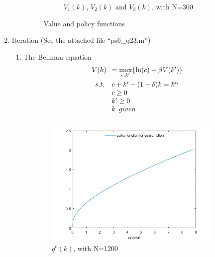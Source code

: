 \documentclass{article}
\begin{document}
\begin{enumerate}
\begin{enumerate}
\begin{figure}[h!]
\begin{subfigure}[b]{.55\linewidth}
                    \caption{$V_1(k)$, $V_2(k)$ and $V_3(k)$, with N=300}
                \end{subfigure}
                \caption{Value and policy functions}
            \end{figure}
        \end{enumerate}
        \item Iteration (See the attached file ``ps6\_q23.m'')
        \begin{enumerate}
            \item The Bellman equation
            \begin{align*}
                &V(k)\enspace=\max_{c,k'}\{\ln(c)+\beta V(k')\}\\
                &\begin{array}{r@{\quad}l}
                    s.t.&c+k'-(1-\delta)k=k^\alpha\\
                    &c\ge0\\
                    &k'\ge0\\
                    &k\enspace given    
                \end{array}           
            \end{align*}
        \end{enumerate}
        \begin{figure}[h!]
                \begin{subfigure}[a]{.55\linewidth}
                    \includegraphics[width=\linewidth]{6_2a2.png}
                    \caption{$g^c(k)$, with N=1200}
                \end{subfigure}
                \begin{subfigure}[a]{.55\linewidth}

\end{subfigure}
\end{figure}
\end{enumerate}
\end{document}
